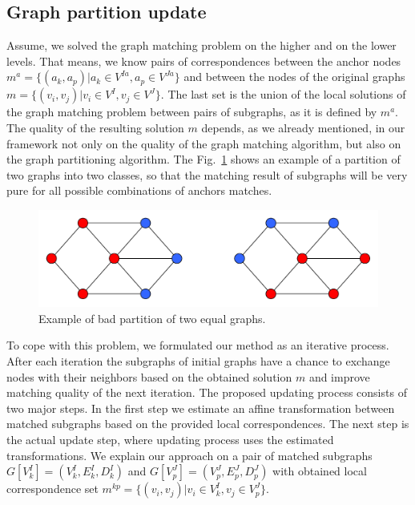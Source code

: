 \subsection{Graph partition update}
Assume, we solved the graph matching problem on the higher and on the lower levels. That means, we know pairs of correspondences between the anchor nodes $m^a = \{(a_k, a_p)|a_k\in V^{Ia}, a_p\in V^{Ja}\}$ and between the nodes of the original graphs $m = \{(v_i, v_j)|v_i\in V^{I}, v_j\in V^{J}\}$. The last set is the union of the local solutions of the graph matching problem between pairs of subgraphs, as it is defined by $m^a$.
The quality of the resulting solution $m$ depends, as we already mentioned, in our framework not only on the quality of the graph matching algorithm, but also on the graph partitioning algorithm.
The Fig.~\ref{fig:badpartition} shows an example of a partition of two graphs into two classes, so that the matching result of subgraphs will be very pure for all possible combinations of anchors matches.

\begin{figure}[h]
	\centering
	\includegraphics[scale=0.35]{chapter2/fig/badpartition.pdf}
	\caption[Example of bad partition of two equal graphs]{Example of bad partition of two equal graphs.} \label{fig:badpartition}
\end{figure}

To cope with this problem, we formulated our method as an iterative process. After each iteration the subgraphs of initial graphs have a chance to exchange nodes with their neighbors based on the obtained solution $m$ and improve matching quality of the next iteration. The proposed updating process consists of two major steps. In the first step we estimate an affine transformation between matched subgraphs based on the provided local correspondences. The next step is the actual update step, where updating process uses the estimated transformations.
We explain our approach on a pair of matched subgraphs $G[V^I_k]=(V^I_k, E^I_k, D^I_k)$ and $G[V^J_p]=(V^J_p, E^J_p, D^J_p)$  with obtained local correspondence set $m^{kp}=\{(v_i,v_j)|v_i\in V^I_k, v_j\in V^J_p\}$. 

